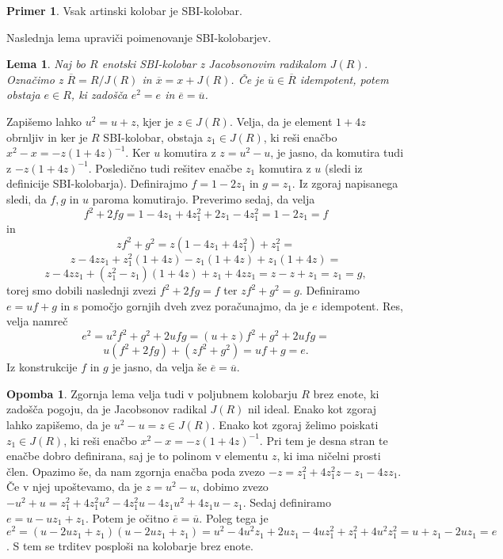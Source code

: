 \documentclass[a4paper, 12pt]{amsart}
\theoremstyle{definition} %
\newtheorem{primer}[definicija]{Primer}
\newtheorem{opomba}[definicija]{Opomba}
\theoremstyle{plain} %
\newtheorem{lema}[definicija]{Lema}
\begin{document}
\begin{primer}
Vsak artinski kolobar je SBI-kolobar.
\end{primer}

Naslednja lema upraviči poimenovanje SBI-kolobarjev.

\begin{lema}
\label{SBIEnIdem}
Naj bo $R$ enotski SBI-kolobar z Jacobsonovim radikalom $J(R)$. Označimo z $\overline{R} = R/J(R)$ in $\overline{x} = x + J(R)$. Če je $\overline{u} \in \overline{R}$ idempotent, potem obstaja $e\in R$, ki zadošča $e^2 = e$ in $\overline{e} = \overline{u}$.
\end{lema}

\proof
Zapišemo lahko $u^2 = u+z$, kjer je $z\in J(R)$. Velja, da je element $1+4z$ obrnljiv in ker je $R$ SBI-kolobar, obstaja $z_1\in  J(R)$, ki reši enačbo $x^2 - x = -z(1+4z)^{-1}$. Ker $u$ komutira z $z=u^2 - u$, je jasno, da komutira tudi z $-z(1+4z)^{-1}$. Posledično tudi rešitev enačbe $z_1$ komutira z $u$ (sledi iz definicije SBI-kolobarja). Definirajmo $f=1-2z_1$ in $g=z_1$. Iz zgoraj napisanega sledi, da $f,g$ in $u$ paroma komutirajo. Preverimo sedaj, da velja
$$
f^2 +2fg = 1-4z_1 + 4 z_1^2 + 2z_1 - 4z_1^2 = 1 - 2z_1 = f
$$  
in
$$
zf^2 + g^2 = z(1-4z_1 + 4z_1^2) + z_1^2 =
$$
$$
z- 4zz_1 + z_1^2(1+4z) - z_1(1+4z) + z_1(1+4z) =
$$
$$
z - 4zz_1 + (z_1^2 - z_1)(1+4z) + z_1 +4zz_1 = z-z+z_1=z_1=g,
$$
torej smo dobili naslednji zvezi $f^2 + 2fg = f$ ter $zf^2 + g^2 = g$. Definiramo $e = uf +g$ in s pomočjo gornjih dveh zvez poračunajmo, da je $e$ idempotent. Res, velja namreč
$$
e^2 = u^2 f^2 + g^2 + 2ufg = (u+z)f^2 + g^2 + 2ufg = 
$$
$$
u(f^2 +2fg) + (zf^2 +g^2) = uf +g = e.
$$
Iz konstrukcije $f$ in $g$ je jasno, da velja še $\overline{e} = \overline{u}$.
\endproof

\begin{opomba}
Zgornja lema velja tudi v poljubnem kolobarju $R$ brez enote, ki zadošča pogoju, da je Jacobsonov radikal $J(R)$ nil ideal. Enako kot zgoraj lahko zapišemo, da je $u^2 - u = z\in J(R)$. Enako kot zgoraj želimo poiskati $z_1\in J(R)$, ki reši enačbo $x^2 - x = -z(1+4z)^{-1}$. Pri tem je desna stran te enačbe dobro definirana, saj je to polinom v elementu $z$, ki ima ničelni prosti člen. Opazimo še, da nam zgornja enačba poda zvezo $-z=z_1^2 +4z_1^2z - z_1 - 4zz_1$. Če v njej upoštevamo, da je $z = u^2 - u$, dobimo zvezo $-u^2 +u = z_1^2 + 4z_1^2 u^2 - 4z_1^2 u-4z_1u^2 +4z_1u - z_1$. Sedaj definiramo $e=u-uz_1 + z_1$. Potem je očitno $\overline{e} = \overline{u}$. Poleg tega je $e^2 = (u-2uz_1+z_1)(u-2uz_1 + z_1) = u^2 - 4u^2 z_1 +2uz_1 - 4uz_1^2 + z_1^2 + 4u^2z_1^2 = u+z_1 - 2uz_1=e$. S tem se trditev posploši na kolobarje brez enote.
\end{opomba}
\end{document}
